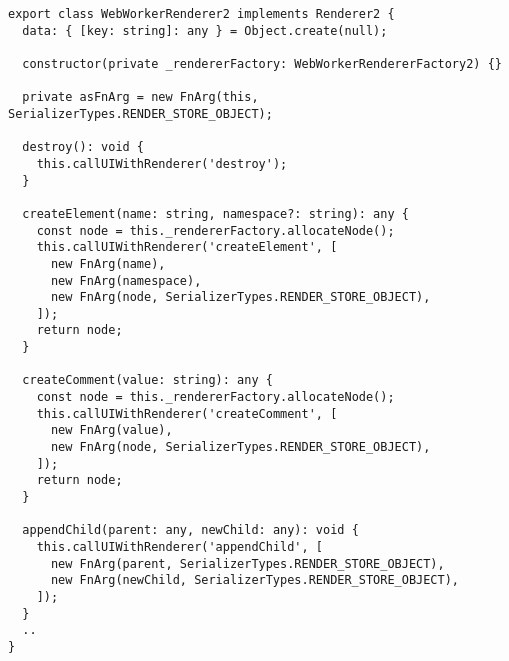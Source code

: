 \begin{verbatim}
export class WebWorkerRenderer2 implements Renderer2 {
  data: { [key: string]: any } = Object.create(null);

  constructor(private _rendererFactory: WebWorkerRendererFactory2) {}

  private asFnArg = new FnArg(this, SerializerTypes.RENDER_STORE_OBJECT);

  destroy(): void {
    this.callUIWithRenderer('destroy');
  }

  createElement(name: string, namespace?: string): any {
    const node = this._rendererFactory.allocateNode();
    this.callUIWithRenderer('createElement', [
      new FnArg(name),
      new FnArg(namespace),
      new FnArg(node, SerializerTypes.RENDER_STORE_OBJECT),
    ]);
    return node;
  }

  createComment(value: string): any {
    const node = this._rendererFactory.allocateNode();
    this.callUIWithRenderer('createComment', [
      new FnArg(value),
      new FnArg(node, SerializerTypes.RENDER_STORE_OBJECT),
    ]);
    return node;
  }

  appendChild(parent: any, newChild: any): void {
    this.callUIWithRenderer('appendChild', [
      new FnArg(parent, SerializerTypes.RENDER_STORE_OBJECT),
      new FnArg(newChild, SerializerTypes.RENDER_STORE_OBJECT),
    ]);
  }
  ..
}
\end{verbatim}
